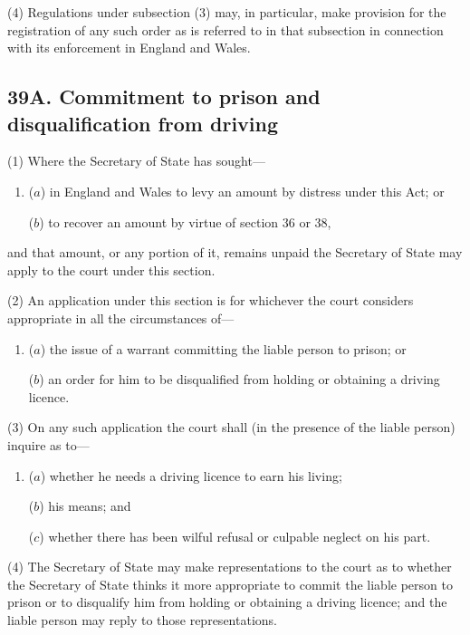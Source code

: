 \documentclass[a4paper]{article}
\begin{document}
(4) Regulations under subsection (3) may, in particular, make provision for the registration of any such order as is referred to in that subsection in connection with its enforcement in England and Wales.


\subsection{39A. Commitment to prison and disqualification from driving}

(1) Where the Secretary of State has sought---
\begin{enumerate}\item[]
($a$) in England and Wales to levy an amount by distress under this Act; or

($b$) to recover an amount by virtue of section 36 or 38, 
\end{enumerate}
and that amount, or any
portion of it, remains unpaid the Secretary of State may apply to the court
under this section.

(2)
An application under this section is for whichever the court considers appropriate in all the circumstances of---
\begin{enumerate}\item[]
($a$) the issue of a warrant committing the liable person to prison; or

($b$) an order for him to be disqualified from holding or obtaining a driving
licence.
\end{enumerate}

(3)
On any such application the court shall (in the presence of the liable person) inquire as to---
\begin{enumerate}\item[]
($a$) whether he needs a driving licence to earn his living;

($b$) his means; and

($c$) whether there has been wilful refusal or culpable neglect on his part.
\end{enumerate}

(4)
The Secretary of State may make representations to the court as to whether the Secretary of State thinks it more appropriate to commit the liable person to prison or to disqualify him from holding or obtaining a driving licence; and the liable person may reply to those representations.
\end{document}
